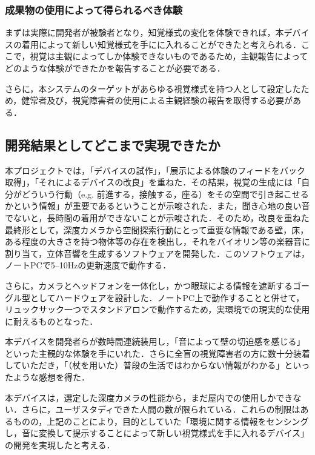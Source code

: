 \subsubsection{成果物の使用によって得られるべき体験}
まずは実際に開発者が被験者となり，知覚様式の変化を体験できれば，本デバイスの着用によって新しい知覚様式を手にに入れることができたと考えられる．ここで，視覚は主観によってしか体験できないものであるため，主観報告によってどのような体験ができたかを報告することが必要である．

さらに，本システムのターゲットがあらゆる視覚様式を持つ人として設定したため，健常者及び，視覚障害者の使用による主観経験の報告を取得する必要がある．

\subsection{開発結果としてどこまで実現できたか}
本プロジェクトでは，「デバイスの試作」，「展示による体験のフィードをバック取得」，「それによるデバイスの改良」を重ねた．その結果，視覚の生成には「自分がどういう行動（e.g. 前進する，接触する，座る）をその空間で引き起こせるかという情報」が重要であるということが示唆された．また，聞き心地の良い音でないと，長時間の着用ができないことが示唆された．そのため，改良を重ねた最終形として，深度カメラから空間探索行動にとって重要な情報である壁，床，ある程度の大きさを持つ物体等の存在を検出し，それをバイオリン等の楽器音に割り当て，立体音響を生成するソフトウェアを開発した．このソフトウェアは，ノートPCで5--10Hzの更新速度で動作する．

さらに，カメラとヘッドフォンを一体化し，かつ眼球による情報を遮断するゴーグル型としてハードウェアを設計した．ノートPC上で動作することと併せて，リュックサック一つでスタンドアロンで動作するため，実環境での現実的な使用に耐えるものとなった．

本デバイスを開発者らが数時間連続装用し，「音によって壁の切迫感を感じる」といった主観的な体験を手にいれた．さらに全盲の視覚障害者の方に数十分装着していただき，「（杖を用いた）普段の生活ではわからない情報がわかる」といったような感想を得た．

本デバイスは，選定した深度カメラの性能から，まだ屋内での使用しかできない．さらに，ユーザスタディできた人間の数が限られている．これらの制限はあるものの，上記のことにより，目的としていた「環境に関する情報をセンシングし，音に変換して提示することによって新しい視覚様式を手に入れるデバイス」の開発を実現したと考える．

